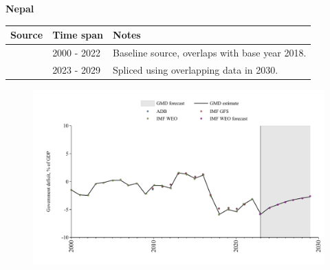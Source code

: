 \documentclass[12pt,a4paper,landscape]{article}
\begin{document}
\begin{adjustbox}{max totalsize={\paperwidth}{\paperheight},center}
\begin{minipage}[t][\textheight][t]{\textwidth}
\vspace*{0.5cm}
{}
\begin{center}
{\Large\bfseries Nepal}
\end{center}
\vspace{0.5cm}
\begin{table}[H]
\centering
\small
\begin{tabular}{|l|l|l|}
\hline
\textbf{Source} & \textbf{Time span} & \textbf{Notes} \\
\hline
\rowcolor{white}\cite{IMF_WEO}& 2000 - 2022 &Baseline source, overlaps with base year 2018.\\
\rowcolor{lightgray}\cite{IMF_WEO_forecast}& 2023 - 2029 &Spliced using overlapping data in 2030.\\
\hline
\end{tabular}
\end{table}
\begin{figure}[H]
\centering
\includegraphics[width=\textwidth,height=0.6\textheight,keepaspectratio]{graphs/NPL_govdef_GDP.pdf}
\end{figure}
\end{minipage}
\end{adjustbox}
\end{document}
